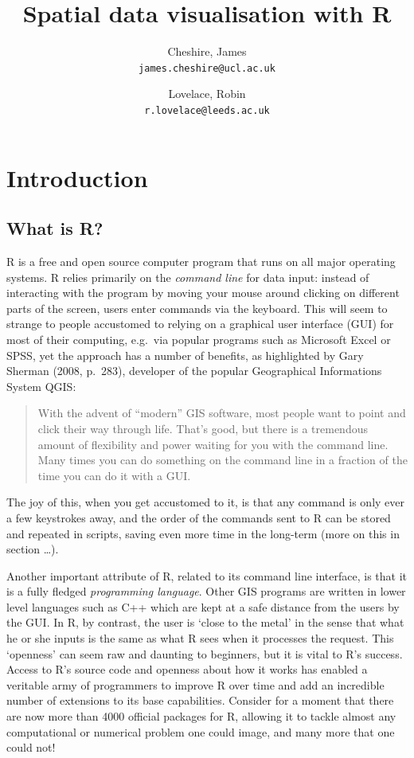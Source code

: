 \documentclass[]{article}
\author{
Cheshire, James\\
\texttt{james.cheshire@ucl.ac.uk}
\and
Lovelace, Robin\\
\texttt{r.lovelace@leeds.ac.uk}
}
\title{Spatial data visualisation with R}
\begin{document}
\maketitle

\section{Introduction}

\subsection{What is R?}

R is a free and open source computer program that runs on all major
operating systems. R relies primarily on the \emph{command line} for
data input: instead of interacting with the program by moving your mouse
around clicking on different parts of the screen, users enter commands
via the keyboard. This will seem to strange to people accustomed to
relying on a graphical user interface (GUI) for most of their computing,
e.g.~via popular programs such as Microsoft Excel or SPSS, yet the
approach has a number of benefits, as highlighted by Gary Sherman (2008,
p.~283), developer of the popular Geographical Informations System QGIS:

\begin{quote}
With the advent of ``modern'' GIS software, most people want to point
and click their way through life. That's good, but there is a tremendous
amount of flexibility and power waiting for you with the command line.
Many times you can do something on the command line in a fraction of the
time you can do it with a GUI.

\end{quote}
The joy of this, when you get accustomed to it, is that any command is
only ever a few keystrokes away, and the order of the commands sent to R
can be stored and repeated in scripts, saving even more time in the
long-term (more on this in section \ldots{}).

Another important attribute of R, related to its command line interface,
is that it is a fully fledged \emph{programming language}. Other GIS
programs are written in lower level languages such as C++ which are kept
at a safe distance from the users by the GUI. In R, by contrast, the
user is `close to the metal' in the sense that what he or she inputs is
the same as what R sees when it processes the request. This `openness'
can seem raw and daunting to beginners, but it is vital to R's success.
Access to R's source code and openness about how it works has enabled a
veritable army of programmers to improve R over time and add an
incredible number of extensions to its base capabilities. Consider for a
moment that there are now more than 4000 official packages for R,
allowing it to tackle almost any computational or numerical problem one
could image, and many more that one could not!
\end{document}
